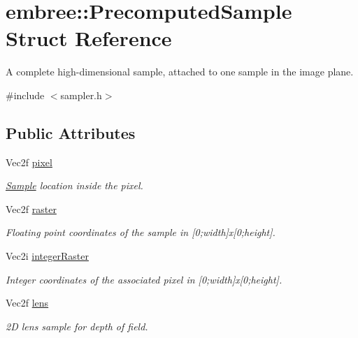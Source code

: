 \hypertarget{structembree_1_1_precomputed_sample}{
\section{embree::PrecomputedSample Struct Reference}
\label{structembree_1_1_precomputed_sample}
}


A complete high-\/dimensional sample, attached to one sample in the image plane.  




{\ttfamily \#include $<$sampler.h$>$}

\subsection*{Public Attributes}
\begin{DoxyCompactItemize}
\item 
Vec2f \hyperlink{structembree_1_1_precomputed_sample_a03538d74672d4cb9562d676aa1e6bb86}{pixel}
\begin{DoxyCompactList}\small\item\em \hyperlink{structembree_1_1_sample}{Sample} location inside the pixel. \item\end{DoxyCompactList}\item 
Vec2f \hyperlink{structembree_1_1_precomputed_sample_a8f8f6b2cb738ab9627878360f898ec3e}{raster}
\begin{DoxyCompactList}\small\item\em Floating point coordinates of the sample in \mbox{[}0;width\mbox{]}x\mbox{[}0;height\mbox{]}. \item\end{DoxyCompactList}\item 
Vec2i \hyperlink{structembree_1_1_precomputed_sample_adec22f991b28ee05f8f7297964918ab1}{integerRaster}
\begin{DoxyCompactList}\small\item\em Integer coordinates of the associated pixel in \mbox{[}0;width\mbox{]}x\mbox{[}0;height\mbox{]}. \item\end{DoxyCompactList}\item 
Vec2f \hyperlink{structembree_1_1_precomputed_sample_a3aebb258d27d6c2555d2f8ee0f5bc6b1}{lens}
\begin{DoxyCompactList}\small\item\em 2D lens sample for depth of field. \item\end{DoxyCompactList}\item 

\end{DoxyCompactItemize}
